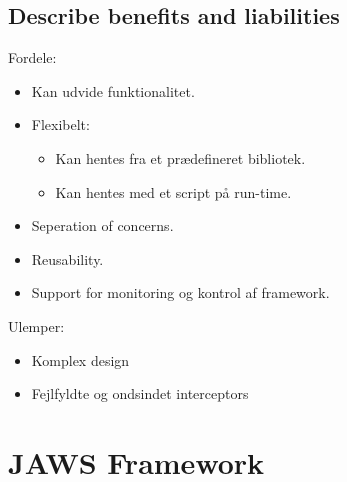 \documentclass{article}
\begin{document}
\subsection{Describe benefits and liabilities}

Fordele:
\vspace{-10pt}
\begin{itemize}
	\item Kan udvide funktionalitet.
	\item Flexibelt:
	\begin{itemize}
	 	\item Kan hentes fra et prædefineret bibliotek.
	 	\item Kan hentes med et script på run-time.
	 \end{itemize} 
	\item Seperation of concerns.
	\item Reusability.
	\item Support for monitoring og kontrol af framework.
\end{itemize}

Ulemper:
\vspace{-10pt}
\begin{itemize}
	\item Komplex design
	\item Fejlfyldte og ondsindet interceptors
\end{itemize}




\newpage
\section{JAWS Framework}
\end{document}
